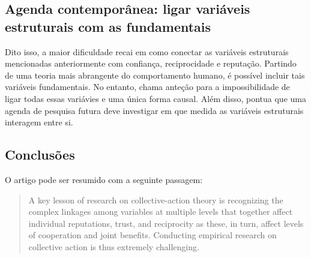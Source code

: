 \documentclass[11pt]{article}
\begin{document}
\subsection{Agenda contemporânea: ligar variáveis estruturais com as fundamentais}
\label{sec:orge8788e2}

Dito isso, a maior dificuldade recai em como conectar as variáveis estruturais mencionadas anteriormente com confiança, reciprocidade e reputação.
Partindo de uma teoria mais abrangente do comportamento humano, é possível incluir tais variáveis fundamentais.
No entanto, chama anteção para a impossibilidade de ligar todas essas variávies e uma única forma causal.
Além disso, pontua que uma agenda de pesquisa futura deve investigar em que medida as variáveis estruturais interagem entre si.
\subsection{Conclusões}
\label{sec:orgdd8221a}

O artigo pode ser resumido com a seguinte passagem:

\begin{quote}
A key lesson of research on collective-action theory is recognizing the complex linkages among variables at multiple levels that together affect individual reputations, trust, and reciprocity as these, in turn, affect levels of cooperation and joint benefits. Conducting empirical research on collective action is thus extremely
challenging.
\end{quote}
\end{document}
